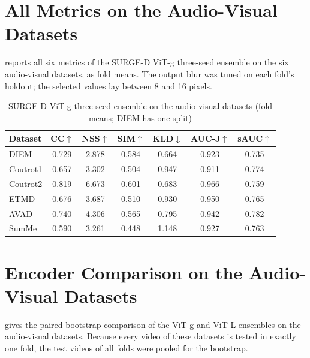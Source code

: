 \section{All Metrics on the Audio-Visual Datasets}

 reports all six metrics of the SURGE-D \acrshort{ViT}-g three-seed
ensemble on the six audio-visual datasets, as fold means. The output blur was
tuned on each fold's holdout; the selected values lay between 8 and 16
pixels.

\begin{table}[htbp]
  \centering
  \caption{SURGE-D \acrshort{ViT}-g three-seed ensemble on the audio-visual datasets (fold
  means; DIEM has one split)}\label{tab:app-av}
  \small
  \begin{tabular}{@{}lcccccc@{}}
    \toprule
    \textbf{Dataset} & \textbf{\acrshort{CC}}$\uparrow$ & \textbf{\acrshort{NSS}}$\uparrow$ & \textbf{\acrshort{SIM}}$\uparrow$
      & \textbf{\acrshort{KLD}}$\downarrow$ & \textbf{\acrshort{AUC-J}}$\uparrow$ & \textbf{\acrshort{sAUC}}$\uparrow$ \\
    \midrule
    DIEM     & 0.729 & 2.878 & 0.584 & 0.664 & 0.923 & 0.735 \\
    Coutrot1 & 0.657 & 3.302 & 0.504 & 0.947 & 0.911 & 0.774 \\
    Coutrot2 & 0.819 & 6.673 & 0.601 & 0.683 & 0.966 & 0.759 \\
    ETMD     & 0.676 & 3.687 & 0.510 & 0.930 & 0.950 & 0.765 \\
    AVAD     & 0.740 & 4.306 & 0.565 & 0.795 & 0.942 & 0.782 \\
    SumMe    & 0.590 & 3.261 & 0.448 & 1.148 & 0.927 & 0.763 \\
    \bottomrule
  \end{tabular}
\end{table}

\section{Encoder Comparison on the Audio-Visual Datasets}

 gives the paired bootstrap comparison of the \acrshort{ViT}-g and
\acrshort{ViT}-L ensembles on the audio-visual datasets. Because every video of these
datasets is tested in exactly one fold, the test videos of all folds were
pooled for the bootstrap.

